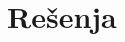 \begin{comment}
\begin{Exercise}[label=p2.5_04] 
 Deda Mraz planira kupovinu poklona za studente koji su vredno učili C u toku godine. Na njegovoj listi se nalazi ime i prezime studenta (niske dužina do 50 karaktera) i njegova želja (niska maksimalne dužine 100 karaktera). Napisati program koji će služiti Deda Mrazu kao podsetnik: na osnovu liste koju je napravio, Deda Mraz može da unese ime i prezime studenta i da proveri njegovu želju. Ako ima više studenata sa istim imenom i prezimenom ispisati sve želje. \textit{Napomena: probati sa testiranjem zadataka pomoću preusmeravanja.}\\
\begin{maxitest}
\begin{upotreba}{1}
#\naslovInt#
#\izlaz{Ime i prezime studenta:}#
#\ulaz{Pera Peric}#
#\izlaz{Njegova zelja:}#
#\ulaz{privezak za kljuceve}#
#\izlaz{Jos vrednih studenata (da/ne)?}#
#\ulaz{da}#
#\izlaz{Ime i prezime studenta:}#
#\ulaz{Zika Zikic}#
#\izlaz{Njegova zelja:}#
#\ulaz{stap za pecanje}#
#\izlaz{Jos vrednih studenata (da/ne)?}#
#\ulaz{da}#
#\izlaz{Ime i prezime studenta:}#
#\ulaz{Mara Maric}#
#\izlaz{Njegova zelja:}#
#\ulaz{komplet Knutovih knjiga}#
#\izlaz{Jos vrednih studenata (da/ne)?}#
#\ulaz{ne}#
#\izlaz{Za podsecanje uneti ime i prezime:}#
#\ulaz{Pera Peric}#
#\izlaz{Novogodisnja zelja: privezak za kljuceve}#
\end{upotreba}
\end{maxitest}

\linkresenje{p2.5_04}
\end{Exercise}
\begin{Answer}[ref=p2.5_04]
\includecode{resenja/2_PredstavljanjePodataka/2.5_Strukture/praktikumi13/4.c}
\end{Answer}



\end{comment}

\section{Rešenja}
\shipoutAnswer


